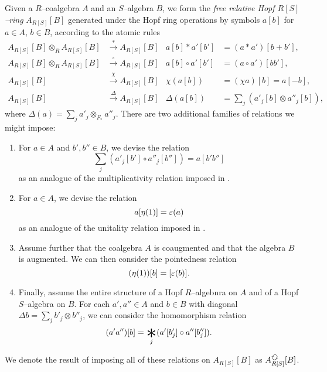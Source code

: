 \begin{definition}\label{DefnAlgebraicModelOfCoopns}
Given a $R$--coalgebra $A$ and an $S$--algebra $B$, we form the \textit{free relative Hopf $R[S]$--ring} $A_{R[S]}[B]$ generated under the Hopf ring operations by symbols $a[b]$ for $a \in A$, $b \in B$, according to the atomic rules
\begin{align*}
A_{R[S]}[B] \otimes_R A_{R[S]}[B] & \xrightarrow{\ast} A_{R[S]}[B] &
a[b] \ast a'[b'] & = (a \ast a') [b + b'], \\
A_{R[S]}[B] \otimes_R A_{R[S]}[B] & \xrightarrow{\circ} A_{R[S]}[B] &
a[b] \circ a'[b'] & = (a \circ a') [b b'], \\
A_{R[S]}[B] & \xrightarrow{\chi} A_{R[S]}[B] &
\chi(a[b]) & = (\chi a)[b] = a[-b], \\
A_{R[S]}[B] & \xrightarrow{\Delta} A_{R[S]}[B] &
\Delta(a[b]) & = \sum_j (a'_j[b] \otimes a''_j[b]),
\end{align*}
where $\Delta(a) = \sum_j a'_j \otimes_{F_*} a''_j$.  There are two additional families of relations we might impose:
\begin{enumerate}
    \item For $a \in A$ and $b', b'' \in B$, we devise the relation \[\sum_j (a'_j[b'] \circ a''_j[b'']) = a[b'b'']\] as an analogue of the multiplicativity relation imposed in .
    \item For $a \in A$, we devise the relation \[a[\eta(1)] = \varepsilon(a)\] as an analogue of the unitality relation imposed in .
    \item Assume further that the coalgebra $A$ is coaugmented and that the algebra $B$ is augmented.  We can then consider the pointedness relation \[(\eta(1))[b] = [\varepsilon(b)].\]
    \item Finally, assume the entire structure of a Hopf $R$--algebnra on $A$ and of a Hopf $S$--algebra on $B$.  For each $a', a'' \in A$ and $b \in B$ with diagonal $\Delta b = \sum_j b'_j \otimes b''_j$, we can consider the homomorphism relation \[(a'a'')[b] = \bigast_j (a'[b'_j] \circ a''[b''_j]).\]
\end{enumerate}
We denote the result of imposing all of these relations on $A_{R[S]}[B]$ as $A_{R[S]}^{\circulatearrows}[B]$.
\end{definition}

